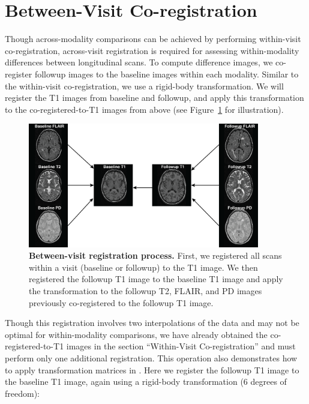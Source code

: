 \section{Between-Visit Co-registration}
Though across-modality comparisons can be achieved by performing within-visit co-registration, across-visit registration is required for assessing within-modality differences between longitudinal scans.   To compute difference images, we co-register followup images to the baseline images within each modality.  Similar to the within-visit co-registration, we use a rigid-body transformation.  We will register the T1 images from baseline and followup, and apply this transformation to the co-registered-to-T1 images from above (see Figure~\ref{fig:reg} for illustration).  

\begin{figure}
\centering
\includegraphics[width = 0.9\textwidth]{Reg_Figure_Option1.png}
\caption{{\bf Between-visit registration process.}  First, we registered all scans within a visit (baseline or followup) to the T1 image.  We then registered the followup T1 image to the baseline T1 image and apply the transformation to the followup T2, FLAIR, and PD images previously co-registered to the followup T1 image. }
\label{fig:reg}
\end{figure}

Though this registration involves two interpolations of the data and may not be optimal for within-modality comparisons, we have already obtained the co-registered-to-T1 images in the section ``Within-Visit Co-registration'' and must perform only one additional registration.  This operation also demonstrates how to apply transformation matrices in .  Here we register the followup T1 image to the baseline T1 image, again using a rigid-body transformation (6 degrees of freedom):

